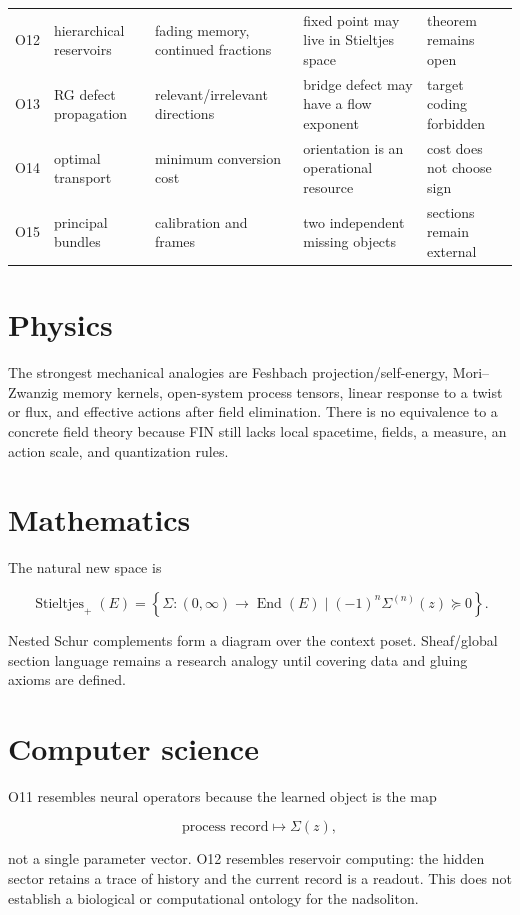\documentclass[11pt,a4paper,openany]{report}
\begin{document}
\begin{center}
\begin{longtable}{@{}p{}p{}p{}p{}p{}@{}}
O12 & hierarchical reservoirs & fading memory, continued fractions & fixed point may live in Stieltjes space & theorem remains open \\
O13 & RG defect propagation & relevant/\allowbreak{}irrelevant directions & bridge defect may have a flow exponent & target coding forbidden \\
O14 & optimal transport & minimum conversion cost & orientation is an operational resource & cost does not choose sign \\
O15 & principal bundles & calibration and frames & two independent missing objects & sections remain external \\
\bottomrule
\end{longtable}
\endgroup
\end{center}

\section{Physics}

The strongest mechanical analogies are Feshbach projection/\allowbreak{}self-energy, Mori--Zwanzig memory kernels, open-system process tensors, linear response to a twist or flux, and effective actions after field elimination. There is no equivalence to a concrete field theory because FIN still lacks local spacetime, fields, a measure, an action scale, and quantization rules.

\section{Mathematics}

The natural new space is

\[
\operatorname{Stieltjes}_+(E)=
\left\{\Sigma:(0,\infty)\to\operatorname{End}(E)\mid
(-1)^n\Sigma^{(n)}(z)\succeq0\right\}.
\]

Nested Schur complements form a diagram over the context poset. Sheaf/\allowbreak{}global section language remains a research analogy until covering data and gluing axioms are defined.

\section{Computer science}

O11 resembles neural operators because the learned object is the map

\[
\text{process record}\longmapsto\Sigma(z),
\]

not a single parameter vector. O12 resembles reservoir computing: the hidden sector retains a trace of history and the current record is a readout. This does not establish a biological or computational ontology for the nadsoliton.
\end{document}
